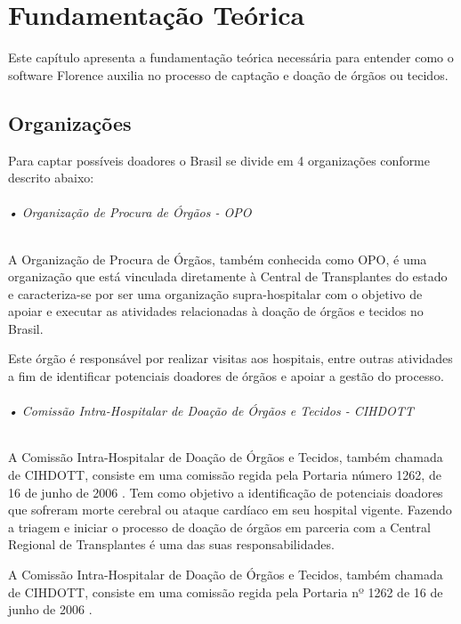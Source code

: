 \documentclass[portuguese,oneside]{tcc}
\begin{document}
\chapter{Fundamentação Teórica}
Este capítulo apresenta a fundamentação teórica necessária para entender como o software Florence auxilia no processo de captação e doação de órgãos ou tecidos.

\section{Organizações}
Para captar possíveis doadores o Brasil se divide em 4 organizações conforme descrito abaixo:

\subparagraph{• Organização de Procura de Órgãos - OPO}
A Organização de Procura de Órgãos, também conhecida como OPO, é uma organização que está vinculada diretamente à Central de Transplantes do estado e caracteriza-se por ser uma organização supra-hospitalar com o objetivo de apoiar e executar as atividades relacionadas à doação de órgãos e tecidos no Brasil.

Este órgão é responsável por realizar visitas aos hospitais, entre outras atividades a fim de identificar potenciais doadores de órgãos e apoiar a gestão do processo\cite{HOSPITALSAOLUCAS}.   %

\subparagraph{• Comissão Intra-Hospitalar de Doação de Órgãos e Tecidos - CIHDOTT}
A Comissão Intra-Hospitalar de Doação de Órgãos e Tecidos, também chamada de CIHDOTT, consiste em uma comissão regida pela Portaria número 1262, de 16 de junho de 2006 \cite{HCI}.
Tem como objetivo a identificação de potenciais doadores que sofreram morte cerebral ou ataque cardíaco em seu hospital vigente. Fazendo a triagem e iniciar o processo de doação de órgãos em parceria com a Central Regional de Transplantes é uma das suas responsabilidades.

A Comissão Intra-Hospitalar de Doação de Órgãos e Tecidos, também chamada de CIHDOTT, consiste em uma comissão regida pela Portaria nº 1262 de 16 de junho de 2006 \cite{HCI}.
\end{document}

